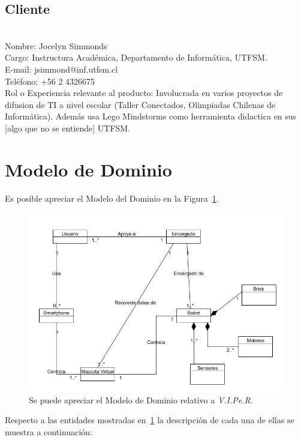 \documentclass[letterpaper,12pt]{article} %
\numberwithin{equation}{section} %
\numberwithin{figure}{section} %
\numberwithin{table}{section} %
\begin{document}
\subsection{Cliente}
~\\
Nombre: Jocelyn Simmonds\\
Cargo: Instructura Acad\'emica, Departamento de Inform\'atica, UTFSM.\\
E-mail: jsimmond@inf.utfsm.cl\\
Tel\'efono: +56 2 4326675\\
Rol o Experiencia relevante al producto: Involucrada en varios proyectos de difusion de TI a nivel escolar (Taller Conectados, Olimpiadas Chilenas de Inform\'atica). Adem\'as usa Lego Mindstorms como herramienta didactica en sus [algo que no se entiende] UTFSM.

\newpage
\section{Modelo de Dominio}

Es posible apreciar el Modelo del Dominio en la Figura~\ref{fig:ModeloDominio}.

\begin{figure}[H]
   \centering
     \includegraphics[scale=0.6]{ModeloDominio.jpg}
   \caption{Se puede apreciar el Modelo de Dominio relativo a \emph{V.I.Pe.R}.}
   \label{fig:ModeloDominio}
\end{figure}

Respecto a las entidades mostradas en~\ref{fig:ModeloDominio} la descripci\'on de cada una de ellas se muestra a continuaci\'on:\\
\end{document}
